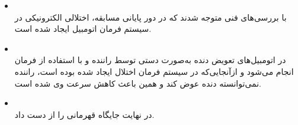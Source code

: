 \begin{qsolve}[]
\begin{enumerate}
		\begin{itemize}
			\item {}\\
			با بررسی‌های فنی متوجه شدند که در دور پایانی مسابقه، اختلالی الکترونیکی در سیستم فرمان اتومبیل  ایجاد شده است.
			
			\item {}\\
			در اتومبیل‌های  تعویض دنده به‌صورت دستی توسط راننده و با استفاده از فرمان انجام می‌شود و ازآنجایی‌که در سیستم فرمان اختلال ایجاد شده بوده است، راننده نمی‌توانسته دنده عوض کند و همین باعث کاهش سرعت وی شده است.
			
			\item {}\\
			در نهایت  جایگاه قهرمانی را از دست داد.
		\end{itemize}
		
	\end{enumerate}
	
\end{qsolve}